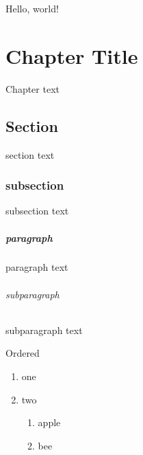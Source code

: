 \documentclass{report}
\begin{document}
Hello, world!

\chapter{Chapter Title}

Chapter text

\section{Section}

section text

\subsection{subsection}

subsection text

\paragraph{paragraph}

paragraph text

\subparagraph{subparagraph}

subparagraph text

Ordered
\begin{enumerate}
  \item one
  \item two
  \begin{enumerate}
    \item apple
    \item bee
  \end{enumerate}
\end{enumerate}
\end{document}
